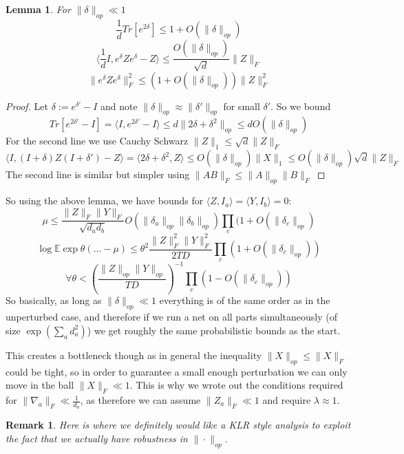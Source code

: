 \documentclass{article}
\newtheorem{lemma}[theorem]{Lemma}
\newtheorem{remark}{Remark}
\newcommand{\E}{\mathbb{E}}
\begin{document}
\begin{lemma}
For $\|\delta\|_{op} \ll 1$
\[ \frac{1}{d} Tr[e^{2\delta}] \leq 1 + O(\|\delta\|_{op})  \]
\[ \langle \frac{1}{d} I, e^{\delta} Z e^{\delta} - Z \rangle \leq \frac{O(\|\delta\|_{op})}{\sqrt{d}} \|Z\|_{F}   \]
\[ \|e^{\delta} Z e^{\delta}\|_{F}^{2} \leq (1 + O(\|\delta\|_{op})) \|Z\|_{F}^{2}   \]
\end{lemma}
\begin{proof}
Let $\delta := e^{\delta'} - I$ and note $\|\delta\|_{op} \approx \|\delta'\|_{op}$ for small $\delta'$. So we bound
\[ Tr[e^{2\delta'} - I] = \langle I, e^{2\delta'} - I \rangle \leq d \|2\delta + \delta^{2}\|_{op} \leq d O(\|\delta\|_{op})   \]
For the second line we use Cauchy Schwarz $\|Z\|_{1} \leq \sqrt{d} \|Z\|_{F}$
\[ \langle I, (I + \delta) Z (I + \delta') - Z \rangle = \langle 2 \delta + \delta^{2}, Z \rangle \leq O(\|\delta\|_{op}) \|X\|_{1} \leq O(\|\delta\|_{op}) \sqrt{d} \|Z\|_{F}  \]
The second line is similar but simpler using $\|AB\|_{F} \leq \|A\|_{op} \|B\|_{F}$
\end{proof}

So using the above lemma, we have bounds for $\langle Z, I_{a} \rangle = \langle Y, I_{b} \rangle = 0$:
\[ \mu \leq \frac{\|Z\|_{F} \|Y\|_{F}}{\sqrt{d_{a} d_{b}}} O(\|\delta_{a}\|_{op} \|\delta_{b}\|_{op}) \prod_{c} (1 + O(\|\delta_{c}\|_{op})  \]
\[ \log \E \exp \theta (... - \mu) \leq \theta^{2} \frac{\|Z\|_{F}^{2} \|Y\|_{F}^{2}}{2TD} \prod_{c} (1 + O(\|\delta_{c}\|_{op}))  \]
\[ \forall \theta < \left( \frac{\|Z\|_{op}\|Y\|_{op}}{TD} \right)^{-1} \prod_{c} (1 - O(\|\delta_{c}\|_{op}))  \]
So basically, as long as $\|\delta\|_{op} \ll 1$ everything is of the same order as in the unperturbed case, and therefore if we run a net on all parts simultaneously (of size $\exp(\sum_{a} d_{a}^{2})$) we get roughly the same probabilistic bounds as the start. 

This creates a bottleneck though as in general the inequality $\|X\|_{op} \leq \|X\|_{F}$ could be tight, so in order to guarantee a small enough perturbation we can only move in the ball $\|X\|_{F} \ll 1$. This is why we wrote out the conditions required for $\|\nabla_{a}\|_{F} \ll \frac{1}{d_{a}}$, as therefore we can assume $\|Z_{a}\|_{F} \ll 1$ and require $\lambda \approx 1$. 

\begin{remark}
Here is where we definitely would like a KLR style analysis to exploit the fact that we actually have robustness in $\|\cdot\|_{op}$. 
\end{remark}
\end{document}
